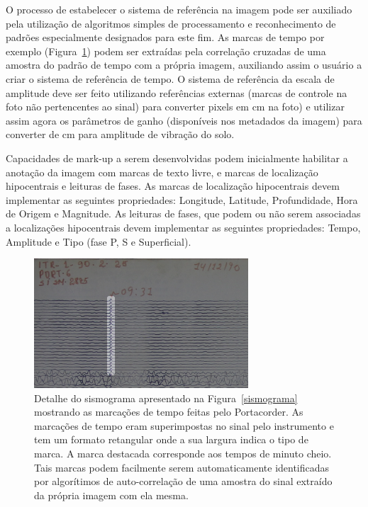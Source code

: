 \documentclass{article}
\begin{document}
O processo de estabelecer o sistema de referência na imagem pode ser
auxiliado pela utilização de algoritmos simples de processamento e
reconhecimento de padrões especialmente designados para este fim. As
marcas de tempo por exemplo (Figura~\ref{detalhe}) podem ser extraídas pela
correlação cruzadas de uma amostra do padrão de tempo com a própria
imagem, auxiliando assim o usuário a criar o sistema de referência de
tempo. O sistema de referência da escala de amplitude deve ser feito
utilizando referências externas (marcas de controle na foto não
pertencentes ao sinal) para converter pixels em cm na foto) e utilizar
assim agora os parâmetros de ganho (disponíveis nos metadados da
imagem) para converter de cm para amplitude de vibração do solo.

Capacidades de mark-up a serem desenvolvidas podem inicialmente
habilitar a anotação da imagem com marcas de texto livre, e marcas de
localização hipocentrais e leituras de fases. As marcas de localização
hipocentrais devem implementar as seguintes propriedades: Longitude,
Latitude, Profundidade, Hora de Origem e  Magnitude. As leituras de
fases, que podem ou não serem associadas a localizações hipocentrais
devem implementar as seguintes propriedades: Tempo, Amplitude e Tipo
(fase P, S e Superficial).

\begin{figure}
  \begin{center}
    \includegraphics[scale=1.1]{detalhe.png}
    \caption{Detalhe do sismograma apresentado na Figura~\ref{sismograma} mostrando as marcações
      de tempo feitas pelo Portacorder. As marcações de tempo eram
      superimpostas no sinal pelo instrumento e tem um formato retangular
      onde a sua largura indica o tipo de marca. A marca destacada
      corresponde aos tempos de minuto cheio. Tais marcas podem facilmente
      serem automaticamente identificadas por algorítimos de
      auto-correlação de uma amostra do sinal extraído da própria imagem
      com ela mesma.}
    \label{detalhe}
  \end{center}
\end{figure}
\end{document}

